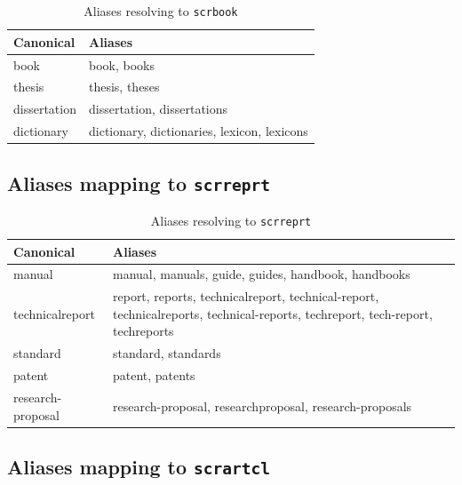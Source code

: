 \begin{table}[htbp]
    \centering
    \caption{Aliases resolving to \texttt{scrbook}}
    \label{tab:aliases-scrbook}
    \begin{tabular}{@{} l l @{}}
        \toprule
        \textbf{Canonical} & \textbf{Aliases} \\
        \midrule
        book &
            book, books \\[2pt]
        thesis &
            thesis, theses \\[2pt]
        dissertation &
            dissertation, dissertations \\[2pt]
        dictionary &
            dictionary, dictionaries, lexicon, lexicons \\
        \bottomrule
    \end{tabular}
\end{table}

\subsection{Aliases mapping to \texttt{scrreprt}}

\begin{table}[htbp]
    \centering
    \caption{Aliases resolving to \texttt{scrreprt}}
    \label{tab:aliases-scrreprt}
    \begin{tabular}{@{} l l @{}}
        \toprule
        \textbf{Canonical} & \textbf{Aliases} \\
        \midrule
        manual &
            manual, manuals, guide, guides, handbook, handbooks \\[2pt]
        technicalreport &
            report, reports, technicalreport, technical-report,
            technicalreports, technical-reports, techreport,
            tech-report, techreports \\[2pt]
        standard &
            standard, standards \\[2pt]
        patent &
            patent, patents \\[2pt]
        research-proposal &
            research-proposal, researchproposal, research-proposals \\
        \bottomrule
    \end{tabular}
\end{table}

\subsection{Aliases mapping to \texttt{scrartcl}}

